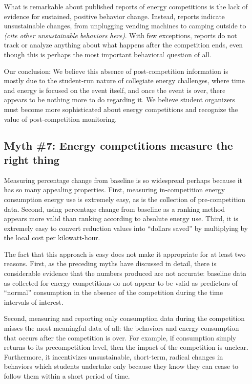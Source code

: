 \documentclass[jou]{apa} %
\begin{document}
What is remarkable about published reports of energy competitions is the lack of evidence
for sustained, positive behavior change. Instead, reports indicate unsustainable changes,
from unplugging vending machines \cite{Petersen07a} to camping outside \cite{Hodge2010} to 
{\em (cite other unsustainable behaviors here)}.   With few exceptions, reports do not
track or analyze anything about what happens after the competition ends, even though this
is perhaps the most important behavioral question of all.  

Our conclusion: We believe this absence of post-competition information is mostly due to
the student-run nature of collegiate energy challenges, where time and energy is focused
on the event itself, and once the event is over, there appears to be nothing more to do
regarding it.  We believe student organizers must become more sophisticated about energy
competitions and recognize the value of post-competition monitoring. 

\subsection{Myth \#7: Energy competitions measure the right thing}

Measuring percentage change from baseline is so widespread perhaps because it has so many
appealing properties.  First, measuring in-competition energy consumption energy use is
extremely easy, as is the collection of pre-competition data.  Second, using percentage
change from baseline as a ranking method appears more valid than ranking according to
absolute energy use. Third, it is extremely easy to convert reduction values into
``dollars saved'' by multiplying by the local cost per kilowatt-hour.

The fact that this approach is easy does not make it appropriate for at least two
reasons.  First, as the preceding myths have discussed in detail, there is considerable
evidence that the numbers produced are not accurate: baseline data as collected for energy
competitions do not appear to be valid as predictors of ``normal'' consumption in the absence
of the competition during the time intervals of interest.  

Second, measuring and reporting only consumption data during the competition misses the
most meaningful data of all: the behaviors and energy consumption that occurs after the
competition is over. For example, if consumption simply returns to its precompetition
level, then the impact of the competition is unclear. Furthermore, it incentivizes
unsustainable, short-term, radical changes in behaviors which students undertake only
because they know they can cease to follow them within a short period of time.
\end{document}

